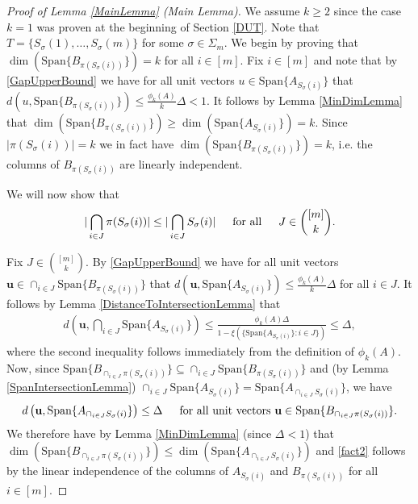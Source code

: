 \documentclass[journal, onecolumn]{IEEEtran}
\begin{document}
\begin{proof}[Proof of Lemma \ref{MainLemma} (Main Lemma)]
We assume $k \geq 2$ since the case $k = 1$ was proven at the beginning of Section \ref{DUT}. Note that $T = \{S_\sigma(1), \ldots, S_\sigma(m)\}$ for some $\sigma \in \Sigma_m$. We begin by proving that $\dim(\text{Span}\{B_{\pi(S_\sigma(i))}\}) = k$ for all $i \in [m]$. Fix $i \in [m]$ and note that by \eqref{GapUpperBound} we have for all unit vectors $u \in \text{Span}\{A_{S_\sigma(i)}\}$ that $d(u, \text{Span}\{B_{\pi(S_\sigma(i))}\}) \leq \frac{\phi_k(A)}{k} \Delta < 1$. It follows by Lemma \ref{MinDimLemma} that $\dim(\text{Span}\{B_{\pi(S_\sigma(i))}\}) \geq \dim(\text{Span}\{A_{S_\sigma(i)}\}) = k$. Since $|\pi(S_\sigma(i))| = k$ we in fact have $\dim(\text{Span}\{B_{\pi(S_\sigma(i))}\}) = k$, i.e. the columns of $B_{\pi(S_\sigma(i))}$ are linearly independent. 

We will now show that
\begin{align}\label{fact2}
|\bigcap_{i \in J} \pi(S_\sigma(i))| \leq |\bigcap_{i \in J} S_\sigma(i) | \indent \text{for all} \indent J \in {[m] \choose k}.
\end{align}

Fix $J \in {[m] \choose k}$. By \eqref{GapUpperBound} we have for all unit vectors $\mathbf{u} \in \cap_{i \in J} \text{Span}\{B_{\pi(S_\sigma(i))}\}$ that $d(\mathbf{u}, \text{Span}\{A_{S_\sigma(i)}\}) \leq \frac{\phi_k(A)}{k} \Delta$ for all $i \in J$. It follows by Lemma \ref{DistanceToIntersectionLemma} that
\begin{align*}
d\left( \mathbf{u}, \bigcap_{i \in J} \text{Span}\{A_{S_{\sigma}(i)}\} \right) 
\leq \frac{ \phi_k(A) \Delta  }{1 - \xi( \{ \text{Span}\{A_{S_{\sigma}(i)}\}: i \in J\} ) } \leq \Delta,
\end{align*}
%
where the second inequality follows immediately from the definition of $\phi_k(A)$. Now, since $\text{Span}\{B_{\cap_{i \in J}\pi(S_\sigma(i))}\} \subseteq \cap_{i \in J} \text{Span}\{B_{\pi(S_\sigma(i))}\}$ and (by Lemma \ref{SpanIntersectionLemma}) $\cap_{i \in J}  \text{Span}\{A_{S_\sigma(i)}\} = \text{Span}\{A_{\cap_{i \in J}  S_\sigma(i)}\}$, we have
\begin{align}\label{fact1}
d\left( \mathbf{u}, \text{Span}\{A_{\cap_{i \in J} S_\sigma(i)}\} \right) \leq \Delta \indent \text{for all unit vectors } \mathbf{u} \in \text{Span}\{B_{\cap_{i \in J}\pi(S_\sigma(i))}\}.
\end{align}
We therefore have by Lemma \ref{MinDimLemma} (since $\Delta < 1$) that $\dim(\text{Span}\{B_{\cap_{i \in J}\pi(S_\sigma(i))}\}) \leq \dim(\text{Span}\{A_{\cap_{i \in J} S_\sigma(i)}\})$ and \eqref{fact2} follows by the linear independence of the columns of $A_{S_\sigma(i)}$ and $B_{\pi(S_\sigma(i))}$ for all $i \in [m]$.


\end{proof}
\end{document}
